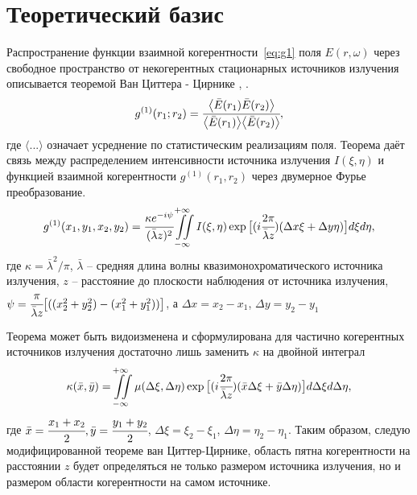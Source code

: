 \chapter{Теоретический базис} \label{chapt1}

Распространение функции взаимной когерентности~\ref{eq:g1} поля $E(r, \omega)$ через свободное пространство от некогерентных стационарных источников излучения описывается теоремой Ван Циттера - Цирнике \cite{van_cittert_wahrscheinliche_1934}, \cite{zernike_concept_1938}. 
\begin{align}
	g^{(1)} (r_1; r_2) = \cfrac{\big \langle \bar{E}(r_1) \bar{E}(r_2) \big \rangle}{\big \langle \bar{E}(r_1)\big \rangle \big \langle\bar{E}(r_2) \big \rangle}, 
	\label{eq:g1} 
\end{align}
где $\big \langle ... \big \rangle$ означает усреднение по статистическим реализациям поля. Теорема даёт связь между распределением интенсивности источника излучения $I(\xi, \eta)$ и функцией взаимной когерентности $g^{(1)} (r_1, r_2)$ через двумерное Фурье преобразование. 
\begin{align}
	g^{(1)} (x_1, y_1, x_2, y_2) = \cfrac{\kappa e^{-i\psi}}{(\bar{\lambda}z)^2} \iint \limits_{-\infty}^{+\infty} I(\xi, \eta) \exp{\big [(i \cfrac{2 \pi}{\bar{\lambda}z}) (\Delta x \xi + \Delta y \eta)\big]}d\xi d\eta, 
	\label{eq:van_cittert_zernike_theorem} 
\end{align}
где $\kappa = \bar{\lambda}^2 / \pi$, $\bar{\lambda}$ -- средняя длина волны квазимонохроматического источника излучения, $z$ -- расстояние до плоскости наблюдения от источника излучения, $\psi = \cfrac{\pi}{\bar{\lambda} z}\big[((x^2_2 + y^2_2) - (x^2_1 + y^2_1)) \big]$, а $\Delta x = x_2 - x_1$, $\Delta y = y_2 - y_1$

Теорема может быть видоизменена и сформулирована для частично когерентных источников излучения достаточно лишь заменить $\kappa$ на двойной интеграл \cite{goodman_statistical_2015}
\begin{align}
	\kappa(\bar{x}, \bar{y}) = \iint \limits_{-\infty}^{+\infty} \mu(\Delta \xi, \Delta \eta) \exp{\big [(i \cfrac{2 \pi}{\bar{\lambda}z}) ( \bar{x} \Delta \xi + \bar{y} \Delta \eta)\big]}d\Delta \xi d\Delta \eta, 
\end{align}
где $\bar{x} = \cfrac{x_1 + x_2}{2}, \bar{y} = \cfrac{y_1 + y_2}{2}$,  $\Delta \xi = \xi_2 - \xi_1$, $\Delta \eta = \eta_2 - \eta_1$. Таким образом, следую модифицированной теореме ван Циттер-Цирнике, область пятна когерентности на расстоянии $z$ будет определяться не только размером источника излучения, но и размером области когерентности на самом источнике. 

